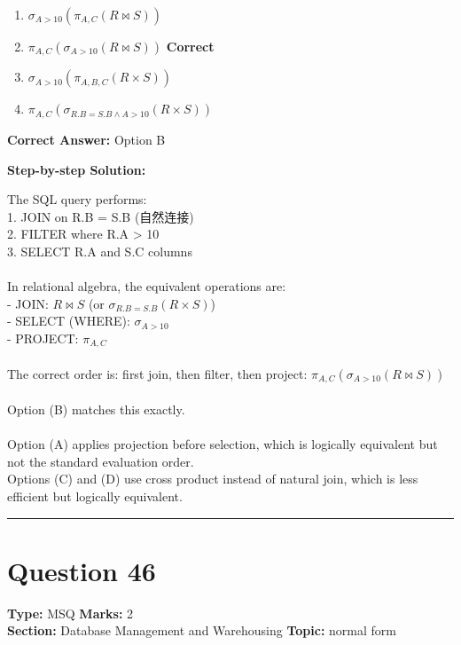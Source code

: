 \documentclass[11pt]{article}
\begin{document}
\begin{enumerate}[label=\textbf{\Alph*.}, leftmargin=1.8em]
\item \(\sigma_{A > 10}(\pi_{A,C}(R \bowtie S))\)\item \(\pi_{A,C}(\sigma_{A > 10}(R \bowtie S))\) \hfill {\color{gategreen}\textbf{Correct}}\item \(\sigma_{A > 10}(\pi_{A,B,C}(R \times S))\)\item \(\pi_{A,C}(\sigma_{R.B = S.B \land A > 10}(R \times S))\)\end{enumerate}

\textbf{Correct Answer:} Option B

\textbf{Step-by-step Solution:}

The SQL query performs:\\
1. JOIN on R.B = S.B (自然连接)\\
2. FILTER where R.A > 10\\
3. SELECT R.A and S.C columns\\
\\
In relational algebra, the equivalent operations are:\\
- JOIN: \(R \bowtie S\) (or \(\sigma_{R.B = S.B}(R \times S)\))\\
- SELECT (WHERE): \(\sigma_{A > 10}\)\\
- PROJECT: \(\pi_{A,C}\)\\
\\
The correct order is: first join, then filter, then project: \(\pi_{A,C}(\sigma_{A > 10}(R \bowtie S))\)\\
\\
Option (B) matches this exactly.\\
\\
Option (A) applies projection before selection, which is logically equivalent but not the standard evaluation order.\\
Options (C) and (D) use cross product instead of natural join, which is less efficient but logically equivalent.

\vspace{0.8em}
\hrule
\vspace{0.4em}
\section*{Question 46}
\textbf{Type:} MSQ \hfill \textbf{Marks:} 2\\
\textbf{Section:} Database Management and Warehousing \hfill \textbf{Topic:} normal form
\end{document}
